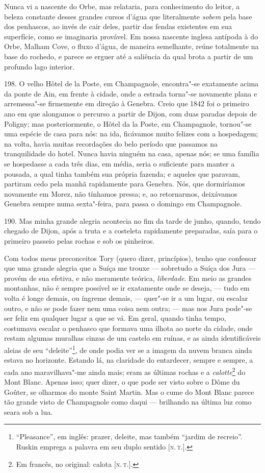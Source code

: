 Nunca vi a nascente do Orbe, mas relataria, para conhecimento do leitor,
a beleza constante desses grandes cursos d'água que literalmente
\emph{sobem} pela base dos penhascos, ao invés de cair deles, partir das
fendas existentes em sua superfície, como se imaginaria provável. Em
nossa nascente inglesa antípoda à do Orbe, Malham Cove, o fluxo d'água,
de maneira semelhante, reúne totalmente na base do rochedo, e parece se
erguer até a saliência da qual brota a partir de um profundo lago
interior.

198. O velho Hôtel de la Poste, em Champagnole, encontra"-se exatamente
acima da ponte de Ain, em frente à cidade, onde a estrada torna"-se
novamente plana e arremessa"-se firmemente em direção à Genebra. Creio
que 1842 foi o primeiro ano em que alongamos o percurso a partir de
Dijon, com duas paradas depois de Poligny; mas posteriormente, o Hôtel
da la Poste, em Champagnole, tornou"-se uma espécie de casa para nós: na
ida, ficávamos muito felizes com a hospedagem; na volta, havia muitas
recordações do belo período que passamos na tranquilidade do hotel.
Nunca havia ninguém na casa, apenas nós; se uma família se hospedasse a
cada três dias, em média, seria o suficiente para manter a pousada, a
qual tinha também sua própria fazenda; e aqueles que paravam, partiram
cedo pela manhã rapidamente para Genebra. Nós, que dormiríamos novamente
em Morez, não tínhamos pressa; e, ao retornarmos, deixávamos Genebra
sempre numa sexta"-feira, para passa o domingo em Champagnole.

190. Mas minha grande alegria acontecia no fim da tarde de junho,
quando, tendo chegado de Dijon, após a truta e a costeleta rapidamente
preparadas, saía para o primeiro passeio pelas rochas e sob os
pinheiros.

Com todos meus preconceitos Tory (quero dizer, princípios), tenho que
confessar que uma grande alegria que a Suíça me trouxe --- sobretudo a
Suíça dos Jura --- provém de sua efetiva, e não meramente teórica,
\emph{liberdade}. Em meio as grandes montanhas, não é sempre possível se
ir exatamente onde se deseja, --- tudo em volta é longe demais, ou
íngreme demais, --- quer"-se ir a um lugar, ou escalar outro, e não se
pode fazer nem uma coisa nem outra; --- mas nos Jura pode"-se ser feliz em
qualquer lugar a que se vá. Em geral, quando tinha tempo, costumava
escalar o penhasco que formava uma ilhota ao norte da cidade, onde
restam algumas muralhas cinzas de um castelo em ruínas, e as ainda
identificáveis aleias de seu ``deleite''\footnote{``Pleasance'', em
  inglês: prazer, deleite, mas também ``jardim de recreio''. Ruskin
  emprega a palavra em seu duplo sentido {[}\textsc{n.\,t.}{]}.}, de onde podia
ver se a imagem da nuvem branca ainda estava no horizonte. Estando lá,
na claridade do entardecer, sempre e sempre, a cada ano maravilhava"-me
ainda mais; eram as últimas rochas e a \emph{calotte}\footnote{Em
  francês, no original: calota {[}\textsc{n.\,t.}{]}.} do Mont Blanc. Apenas
isso; quer dizer, o que pode ser visto sobre o Dôme du Goûter, se
olharmos do monte Saint Martin. Mas o cume do Mont Blanc parece tão
grande visto de Champagnole como daqui --- brilhando na última luz como
seara sob a lua.

